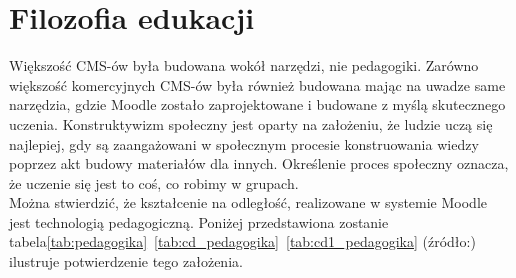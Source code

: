 \section{Filozofia edukacji} \label{roz:fil_edu} 
\hspace{1cm} Większość CMS-ów była budowana wokół narzędzi, nie pedagogiki. Zarówno większość komercyjnych CMS-ów była również budowana mając na uwadze same narzędzia, gdzie Moodle zostało zaprojektowane i budowane z myślą skutecznego uczenia. Konstruktywizm społeczny jest oparty na założeniu, że ludzie uczą się najlepiej, gdy są zaangażowani w społecznym procesie konstruowania wiedzy poprzez akt budowy materiałów dla innych. Określenie proces społeczny oznacza, że uczenie się jest to coś, co robimy w grupach. \\
Można stwierdzić, że kształcenie na odległość, realizowane w systemie Moodle jest technologią pedagogiczną. Poniżej przedstawiona zostanie tabela\ref{tab:pedagogika}~\ref{tab:cd_pedagogika}~\ref{tab:cd1_pedagogika} (źródło:\cite{pedagogika}) ilustruje potwierdzenie tego założenia.

